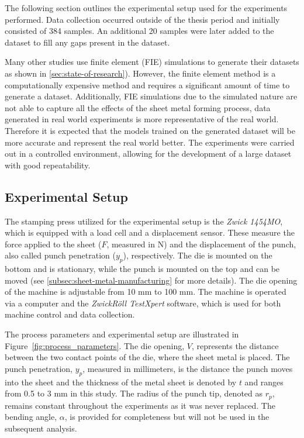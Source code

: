 The following section outlines the experimental setup used for the experiments performed.
Data collection occurred outside of the thesis period and initially consisted of 384 samples.
An additional 20 samples were later added to the dataset to fill any gaps present in the dataset.

Many other studies use finite element (FIE) simulations to generate their datasets as shown in
\cref{sec:state-of-research}).
However, the finite element method is a computationally expensive method and requires a significant amount of time to
generate a dataset.
Additionally, FIE simulations due to the simulated nature are not able to capture all the effects of the sheet metal
forming process, data generated in real world experiments is more representative of the real world.
Therefore it is expected that the models trained on the generated dataset will be more accurate and represent the real
world better.
The experiments were carried out in a controlled environment, allowing for the development of a large dataset with
good repeatability.

\subsection{Experimental Setup}\label{subsec:experimental-setup}
The stamping press utilized for the experimental setup is the \textit{Zwick 1454MO}, which is equipped with a load cell
and a displacement sensor.
These measure the force applied to the sheet ($F$, measured in N) and the displacement of the punch, also called
punch penetration ($y_p$), respectively.
The die is mounted on the bottom and is stationary, while the punch is mounted on the top and can be moved (see
\cref{subsec:sheet-metal-manufacturing} for more details).
The die opening of the machine is adjustable from 10 mm to 100 mm.
The machine is operated via a computer and the \textit{ZwickRöll TestXpert} software, which is used for both machine
control and data collection.

The process parameters and experimental setup are illustrated in Figure~\ref{fig:process_parameters}.
The die opening, $V$, represents the distance between the two contact points of the die, where the sheet metal is
placed.
The punch penetration, $y_p$, measured in millimeters, is the distance the punch moves into the sheet and
the thickness of the metal sheet is denoted by $t$ and ranges from 0.5 to 3 mm in this study.
The radius of the punch tip, denoted as $r_p$, remains constant throughout the experiments as it was never replaced.
The bending angle, $\alpha$, is provided for completeness but will not be used in the subsequent analysis.

